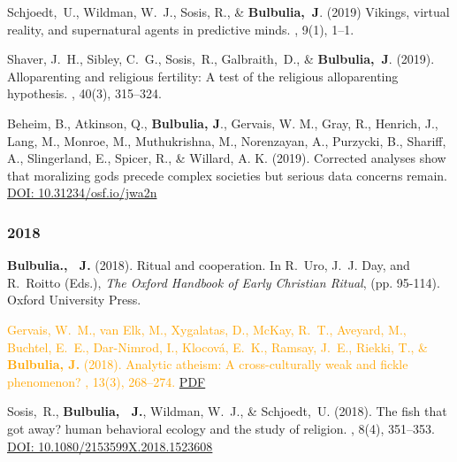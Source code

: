 \documentclass{article}
\begin{document}
\begin{thebibliography}{99}
Schjoedt,~U., Wildman, W.~J., Sosis, R., \& {\bf Bulbulia,~J}. (2019)
\newblock Vikings, virtual reality, and supernatural agents in predictive
  minds.
, 9(1), 1--1.


Shaver, J.~H., Sibley, C.~G., Sosis,~R., Galbraith,~D., \&  {\bf Bulbulia,~J}. (2019).
\newblock Alloparenting and religious fertility: A test of the religious
  alloparenting hypothesis.
, 40(3), 315--324. 


Beheim, B., Atkinson, Q., {\bf Bulbulia, J}., Gervais, W. M., Gray, R., Henrich, J., Lang, M., Monroe, M., Muthukrishna, M., Norenzayan, A., Purzycki, B., Shariff, A., Slingerland, E., Spicer, R., \& Willard, A. K. (2019).
\newblock Corrected analyses show that moralizing gods precede complex societies but serious data concerns remain. 
\href{https://doi.org/10.31234/osf.io/jwa2n}{DOI: 10.31234/osf.io/jwa2n}


\subsubsection*{2018}
{\bf Bulbulia., ~J.} (2018).
\newblock Ritual and cooperation.
\newblock In R.~Uro, J.~J. Day, and R.~Roitto (Eds.), {\em The Oxford
  Handbook of Early Christian Ritual}, (pp. 95-114). Oxford University Press. 


\textcolor{Orange}{Gervais, W.~M., van Elk, M., Xygalatas, D., McKay, R.~T., Aveyard, M., Buchtel,
  E.~E., Dar-Nimrod, I., Klocov{\'a}, E.~K., Ramsay, J.~E., Riekki, T., \& {\bf Bulbulia, J.} (2018).
\newblock Analytic atheism: A cross-culturally weak and fickle phenomenon?
, 13(3), 268--274.}
\href{https://www.dropbox.com/s/0sltfq9mtgzqlxm/Gervaisetal.2018AnalyticAtheism.pdf?dl=0}{PDF}%


Sosis,~R., {\bf Bulbulia, ~J.}, Wildman, W.~J., \& Schjoedt,~U. (2018).
\newblock The fish that got away? human behavioral ecology and the study of religion. 
, 8(4), 351--353. 
\href{https://doi.org/10.1080/2153599X.2018.1523608}{DOI: 10.1080/2153599X.2018.1523608}



\end{thebibliography}
\end{document}
